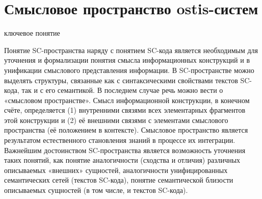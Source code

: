 \section{Смысловое пространство ostis-систем}
\label{sec_sr_semspace}
\begin{SCn}
	\begin{scnrelfromlist}{ключевое понятие}
	\end{scnrelfromlist}
\end{SCn}

Понятие SC-пространства наряду с понятием SC-кода является необходимым для уточнения и формализации понятия смысла информационных конструкций и в унификации смыслового представления информации. В SC-пространстве можно выделять структуры, связанные как с синтаксическими свойствами текстов SC-кода, так и с его семантикой. В последнем случае речь можно вести о «смысловом пространстве». Смысл информационной конструкции, в конечном счёте, определяется (1) внутренними связями всех элементарных фрагментов этой конструкции и (2) её внешними связями с элементами смыслового пространства (её положением в контексте). Смысловое пространство является результатом естественного становления знаний в процессе их интеграции.
Важнейшим достоинством SC-пространства является возможность уточнения таких понятий, как понятие аналогичности (сходства и отличия) различных описываемых «внешних» сущностей, аналогичности унифицированных семантических сетей (текстов SC-кода), понятие семантической близости описываемых сущностей (в том числе, и текстов SC-кода).

